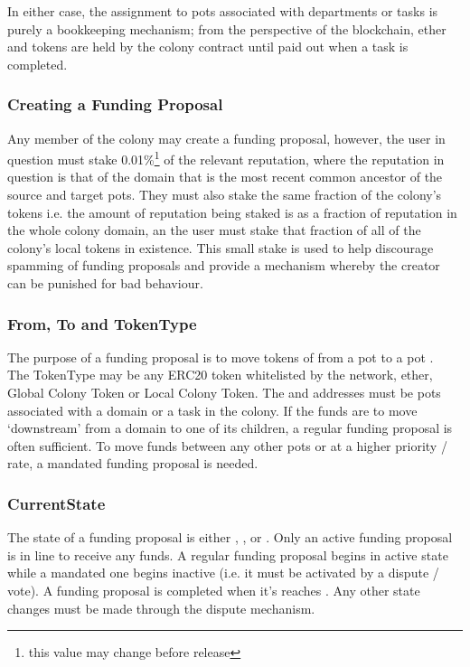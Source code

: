 In either case, the assignment to pots associated with departments or tasks is purely a bookkeeping mechanism; from the perspective of the blockchain, ether and tokens are held by the colony contract until paid out when a task is completed. 

\subsubsection*{Creating a Funding Proposal}
Any member of the colony may create a funding proposal, however, the user in question must stake 0.01\%\footnote{this value may change before release} of the relevant reputation, where the reputation in question is that of the domain that is the most recent common ancestor of the source and target pots. They must also stake the same fraction of the colony's tokens i.e. the amount of reputation being staked is as a fraction of reputation in the whole colony domain, an the user must stake that fraction of all of the colony's local tokens in existence. This small stake is used to help discourage spamming of funding proposals and provide a mechanism whereby the creator can be punished for bad behaviour. 

\subsubsection*{From, To and TokenType}
The purpose of a funding proposal is to move tokens of  from a pot  to a pot . \\
The TokenType may be any ERC20 token whitelisted by the network, ether, Global Colony Token or Local Colony Token. The  and  addresses must be pots associated with a domain or a task in the colony. If the funds are to move `downstream' from a domain to one of its children, a regular funding proposal is often sufficient. To move funds between any other pots or at a higher priority / rate, a mandated funding proposal is needed.

\subsubsection*{CurrentState}
The state of a funding proposal is either , ,  or . Only an active funding proposal is in line to receive any funds. A regular funding proposal begins in active state while a mandated one begins inactive (i.e. it must be activated by a dispute / vote). A funding proposal is completed when it's  reaches . Any other state changes must be made through the dispute mechanism.

